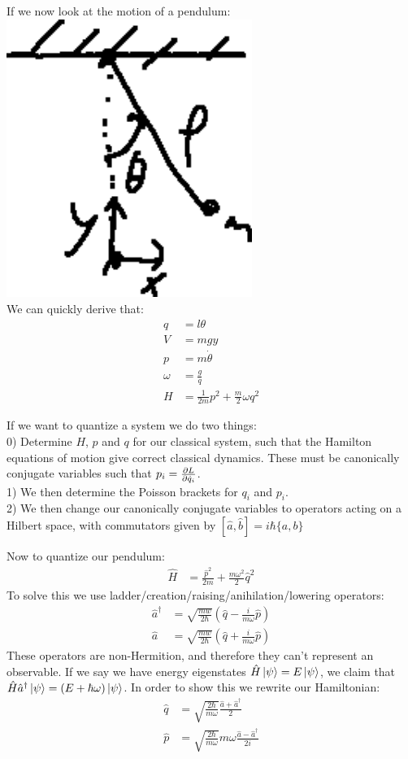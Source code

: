 If we now look at the motion of a pendulum:\\ 
\includegraphics*[width=8cm]{images/1-06-fig1.png} \\
We can quickly derive that:
\begin{align*}
	q &= l\theta \\
	V &= mgy \\
	p &= m\dot{\theta} \\
	\omega &= \frac{g}{q} \\
	H &= \frac{1}{2m} p^2 + \frac{m}{2} \omega q^2
\end{align*}

If we want to quantize a system we do two things: \\
0) Determine $H$, $p$ and $q$ for our classical system, such that the Hamilton equations of motion give correct classical dynamics. These must be canonically conjugate variables such that $p_i = \frac{\partial L}{\partial \dot{q}_i}$. \\
1) We then determine the Poisson brackets for $q_i$ and $p_i$. \\
2) We then change our canonically conjugate variables to operators acting on a Hilbert space, with commutators given by $[\hat{a},\hat{b}] = i\hbar\{a,b\}$

Now to quantize our pendulum:
\begin{align*}
	\hat{H} &= \frac{\hat{p}^2}{2m} + \frac{m\omega^2}{2}\hat{q}^2
\end{align*}
To solve this we use ladder/creation/raising/anihilation/lowering operators:
\begin{align*}
	\hat{a}^\dagger &= \sqrt{\frac{mw}{2\hbar}} \left(\hat{q} - \frac{i}{m\omega} \hat{p}\right) \\
	\hat{a} &= \sqrt{\frac{mw}{2\hbar}} \left(\hat{q} + \frac{i}{m\omega} \hat{p}\right)
\end{align*}
These operators are non-Hermition, and therefore they can't represent an observable. If we say we have energy eigenstates $\hat{H}\ket{\psi} = E\ket{\psi}$, we claim that $\hat{H}\hat{a}^\dagger \ket{\psi} = (E + \hbar\omega)\ket{\psi}$.
In order to show this we rewrite our Hamiltonian:
\begin{align*}
	\hat{q} &= \sqrt{\frac{2\hbar}{m\omega}} \frac{\hat{a} + \hat{a}^\dagger}{2} \\
	\hat{p} &= \sqrt{\frac{2\hbar}{m\omega}} m\omega\frac{\hat{a} - \hat{a}^\dagger}{2i}
\end{align*}

